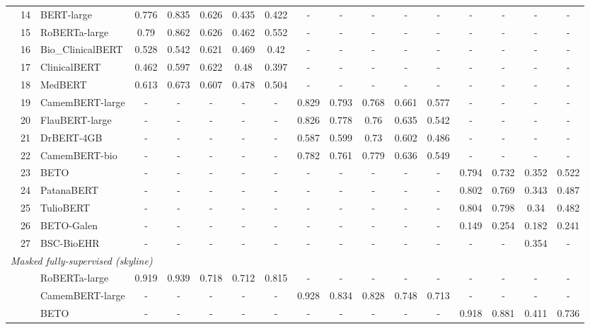 {\begin{tabular}{lll|ccccc|ccccc|cccc}
 & 14 & BERT-large & 0.776 & 0.835 & 0.626 & 0.435 & 0.422 & - & - & - & - & - & - & - & - & - \\
 & 15 & RoBERTa-large & 0.79 & 0.862 & 0.626 & 0.462 & 0.552 & - & - & - & - & - & - & - & - & - \\
 & 16 & Bio\_ClinicalBERT & 0.528 & 0.542 & 0.621 & 0.469 & 0.42 & - & - & - & - & - & - & - & - & - \\
 & 17 & ClinicalBERT & 0.462 & 0.597 & 0.622 & 0.48 & 0.397 & - & - & - & - & - & - & - & - & - \\
 & 18 & MedBERT & 0.613 & 0.673 & 0.607 & 0.478 & 0.504 & - & - & - & - & - & - & - & - & - \\
 & 19 & CamemBERT-large & - & - & - & - & - & 0.829 & 0.793 & 0.768 & 0.661 & 0.577 & - & - & - & - \\
 & 20 & FlauBERT-large & - & - & - & - & - & 0.826 & 0.778 & 0.76 & 0.635 & 0.542 & - & - & - & - \\
 & 21 & DrBERT-4GB & - & - & - & - & - & 0.587 & 0.599 & 0.73 & 0.602 & 0.486 & - & - & - & - \\
 & 22 & CamemBERT-bio & - & - & - & - & - & 0.782 & 0.761 & 0.779 & 0.636 & 0.549 & - & - & - & - \\
 & 23 & BETO & - & - & - & - & - & - & - & - & - & - & 0.794 & 0.732 & 0.352 & 0.522 \\
 & 24 & PatanaBERT & - & - & - & - & - & - & - & - & - & - & 0.802 & 0.769 & 0.343 & 0.487 \\
 & 25 & TulioBERT & - & - & - & - & - & - & - & - & - & - & 0.804 & 0.798 & 0.34 & 0.482 \\
 & 26 & BETO-Galen & - & - & - & - & - & - & - & - & - & - & 0.149 & 0.254 & 0.182 & 0.241 \\
 & 27 & BSC-BioEHR & - & - & - & - & - & - & - & - & - & - & - & - & 0.354 & - \\
\midrule
\midrule
\multicolumn{17}{l}{\textit{Masked fully-supervised (skyline)}} \\
\midrule
 & & RoBERTa-large & 0.919 & 0.939 & 0.718 & 0.712 & 0.815 & - & - & - & - & - & - & - & - & - \\
 & & CamemBERT-large & - & - & - & - & - & 0.928 & 0.834 & 0.828 & 0.748 & 0.713 & - & - & - & - \\
 & & BETO & - & - & - & - & - & - & - & - & - & - & 0.918 & 0.881 & 0.411 & 0.736 \\
\bottomrule
\end{tabular}}